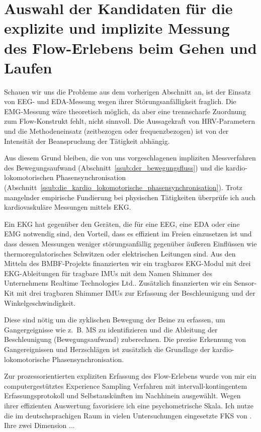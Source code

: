 

\section{Auswahl der Kandidaten für die explizite und implizite Messung des Flow-Erlebens beim Gehen und Laufen} 

\label{sec:auswahl_der_kandidaten_fur_die_explizite_und_implizite_messung_des_flow_erlebens_beim_gehen_und_laufen}

Schauen wir uns die Probleme aus dem vorherigen Abschnitt an, ist der Einsatz von \ac{EEG}- und \ac{EDA}-Messung wegen ihrer Störungsanfälligkeit fraglich. Die \ac{EMG}-Messung wäre theoretisch möglich, da aber eine trennscharfe Zuordnung zum Flow-Konstrukt fehlt, nicht sinnvoll. Die Aussagekraft von \ac{HRV}-Parametern und die Methodeneinsatz (zeitbezogen oder frequenzbezogen) ist von der Intensität der Beanspruchung der Tätigkeit abhängig.

Aus diesem Grund bleiben, die von uns vorgeschlagenen impliziten Messverfahren des Bewegungsaufwand (Abschnitt~\ref{ssub:der_bewegungsfluss}) und die kardio-lokomotorischen Phasensynchronisation (Abschnitt~\ref{ssub:die_kardio_lokomotorische_phasensynchronisation}). Trotz mangelnder empirische Fundierung bei physischen Tätigkeiten überprüfe ich auch kardiovaskuläre Messungen mittels \ac{EKG}. 

Ein \ac{EKG} hat gegenüber den Geräten, die für eine \ac{EEG}, eine \ac{EDA} oder eine \ac{EMG} notwendig sind, den Vorteil, dass es effizient im Freien einzusetzen ist und dass dessen Messungen weniger störungsanfällig gegenüber äußeren Einflüssen wie thermoregulatorisches Schwitzen oder elektrischen Leitungen sind. Aus den Mitteln des \acs{BMBF}-Projekts finanzierten wir ein tragbares EKG-Modul mit drei \ac{EKG}-Ableitungen für tragbare \acp{IMU} mit dem Namen Shimmer des Unternehmens Realtime Technologies Ltd.. Zusätzlich finanzierten wir ein Sensor-Kit mit drei tragbaren Shimmer \acp{IMU} zur Erfassung der Beschleunigung und der Winkelgeschwindigkeit.

Diese sind nötig um die zyklischen Bewegung der Beine zu erfassen, um Gangergeignisse wie z.~B. \ac{MS} zu identifizieren und die Ableitung der Beschleunigung (Bewegungsaufwand) zuberechnen. Die prezise Erkennung von Gangereignissen und Herzschlägen ist zusätzlich die Grundlage der kardio-lokomotorische Phasensynchronisation. 

Zur prozessorientierten expliziten Erfassung des Flow-Erlebens wurde von mir ein computergestütztes Experience Sampling Verfahren mit intervall-kontingentem Erfassungsprotokoll und Selbstauskünften im Nachhinein ausgewählt. Wegen ihrer effizienten Auswertung favorisiere ich eine psychometrische Skala. Ich nutze die im deutschsprachigen Raum in vielen Untersuchungen eingesetzte \ac{FKS} von \citet{Rheinberg2003}. Ihre zwei Dimension ... 

